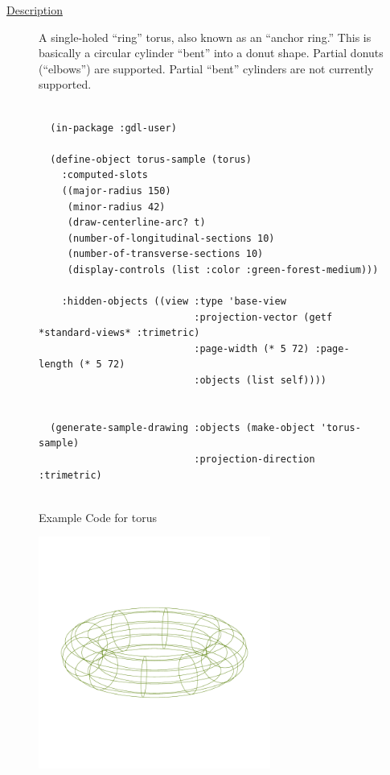 \documentclass [11pt]{book}
\begin{document}
\begin{itemize}
\begin{description}

\item [
\underline{Description}]


A single-holed ``ring'' torus, also known as an ``anchor ring.''
This is basically a circular cylinder ``bent'' into a donut shape. Partial donuts (``elbows'') are supported.
Partial ``bent'' cylinders are not currently supported.



\end{description}




\begin{figure}
\begin{lrbox}{\boxedverb}
\begin{minipage}{\linewidth}
{\small

\begin{verbatim}
  
  (in-package :gdl-user)
  
  (define-object torus-sample (torus)
    :computed-slots
    ((major-radius 150)
     (minor-radius 42)
     (draw-centerline-arc? t)
     (number-of-longitudinal-sections 10)
     (number-of-transverse-sections 10)
     (display-controls (list :color :green-forest-medium)))

    :hidden-objects ((view :type 'base-view
                           :projection-vector (getf *standard-views* :trimetric)
                           :page-width (* 5 72) :page-length (* 5 72)
                           :objects (list self))))
  

  (generate-sample-drawing :objects (make-object 'torus-sample) 
                           :projection-direction :trimetric)
                  

\end{verbatim}}
\end{minipage}
\end{lrbox}
\fbox{\usebox{\boxedverb}}

\caption{Example Code for torus}

\label{fig:example-code-torus}

\end{figure}

\begin{figure}
\begin{center}
\includegraphics[width=3in,height=3in]{../images/example-torus.pdf}
\end{center}


\end{figure}
\end{itemize}
\end{document}
